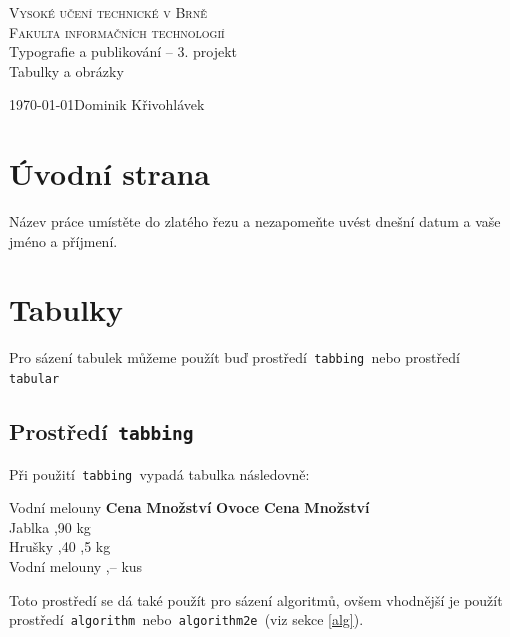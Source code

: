 \documentclass[11pt, a4paper]{article}
\begin{document}
%
\begin{titlepage}
%
\begin{center}
%
\Huge
\textsc{Vysoké učení technické v Brně\\
\huge Fakulta informačních technologií\\}
%
%
{\LARGE
Typografie a publikování -- 3. projekt\\
\Huge Tabulky a obrázky\\}
%
%
\end{center}
{\Large \today \hfill Dominik Křivohlávek}
\medskip
\end{titlepage}
%
\section{Úvodní strana}
Název práce umístěte do zlatého řezu a nezapomeňte uvést dnešní datum a vaše jméno a příjmení.\par
%
\section{Tabulky}
Pro sázení tabulek můžeme použít buď prostředí\texttt{ tabbing }nebo prostředí\texttt{ tabular }\par
%
\subsection{Prostředí\texttt{ tabbing }}
Při použití\texttt{ tabbing }vypadá tabulka následovně:
%
\begin{tabbing}
Vodní melouny \quad\= \textbf{Cena} \quad\= \textbf{Množství} \kill
\textbf{Ovoce} \> \textbf{Cena} \> \textbf{Množství} \\
Jablka ,90  kg \\
Hrušky ,40 ,5 kg \\
Vodní melouny ,--  kus\\
\end{tabbing}
%
Toto prostředí se dá také použít pro sázení algoritmů, ovšem vhodnější je použít prostředí\texttt{ algorithm }nebo\texttt{ algorithm2e }(viz sekce \ref{alg}).
%
\end{document}
